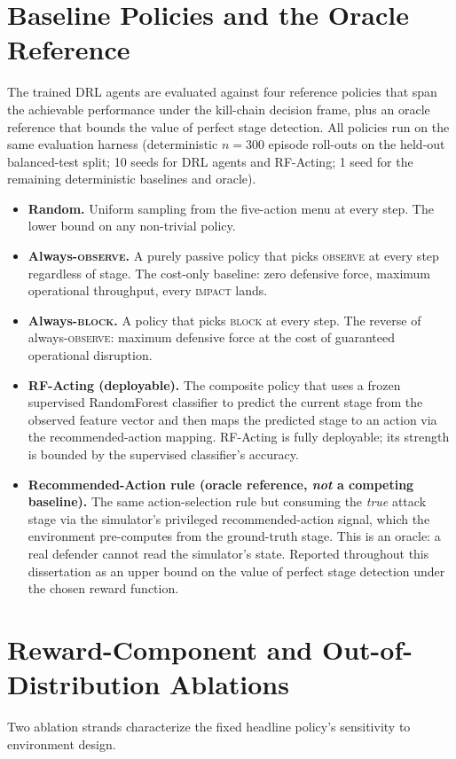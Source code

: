 \section{Baseline Policies and the Oracle Reference}\label{sec:baselines}
The trained DRL agents are evaluated against four reference policies that span the achievable performance under the kill-chain decision frame, plus an oracle reference that bounds the value of perfect stage detection. All policies run on the same evaluation harness (deterministic $n = 300$ episode roll-outs on the held-out balanced-test split; 10 seeds for DRL agents and RF-Acting; 1 seed for the remaining deterministic baselines and oracle).

\begin{itemize}
    \item \textbf{Random.} Uniform sampling from the five-action menu at every step. The lower bound on any non-trivial policy.
    \item \textbf{Always-\textsc{observe}.} A purely passive policy that picks \textsc{observe} at every step regardless of stage. The cost-only baseline: zero defensive force, maximum operational throughput, every \textsc{impact} lands.
    \item \textbf{Always-\textsc{block}.} A policy that picks \textsc{block} at every step. The reverse of always-\textsc{observe}: maximum defensive force at the cost of guaranteed operational disruption.
    \item \textbf{RF-Acting (deployable).} The composite policy that uses a frozen supervised RandomForest classifier to predict the current stage from the observed feature vector and then maps the predicted stage to an action via the recommended-action mapping. RF-Acting is fully deployable; its strength is bounded by the supervised classifier's accuracy.
    \item \textbf{Recommended-Action rule (oracle reference, \emph{not} a competing baseline).} The same action-selection rule but consuming the \emph{true} attack stage via the simulator's privileged recommended-action signal, which the environment pre-computes from the ground-truth stage. This is an oracle: a real defender cannot read the simulator's state. Reported throughout this dissertation as an upper bound on the value of perfect stage detection under the chosen reward function.
\end{itemize}

\section{Reward-Component and Out-of-Distribution Ablations}\label{sec:ablations}
Two ablation strands characterize the fixed headline policy's sensitivity to environment design.

